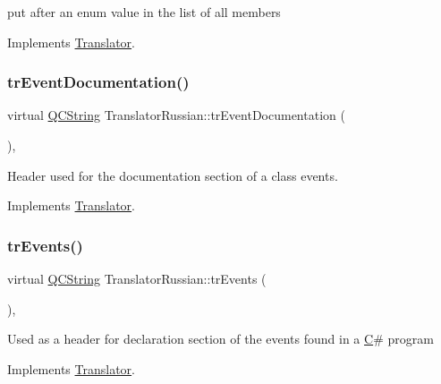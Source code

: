 put after an enum value in the list of all members 

Implements \mbox{\hyperlink{class_translator}{Translator}}.

\mbox{\label{class_translator_russian_a97ef3ac0ca3f70ea589feaa6b0208c50}} 
\subsubsection{\texorpdfstring{trEventDocumentation()}{trEventDocumentation()}}
{\footnotesize\ttfamily virtual \mbox{\hyperlink{class_q_c_string}{Q\+C\+String}} Translator\+Russian\+::tr\+Event\+Documentation (\begin{DoxyParamCaption}{ }\end{DoxyParamCaption})\hspace{0.3cm}{\ttfamily [inline]}, {\ttfamily [virtual]}}

Header used for the documentation section of a class\textquotesingle{} events. 

Implements \mbox{\hyperlink{class_translator}{Translator}}.

\mbox{\label{class_translator_russian_a6f01b3a46dbb6fc8d718c1d1060ff01b}} 
\subsubsection{\texorpdfstring{trEvents()}{trEvents()}}
{\footnotesize\ttfamily virtual \mbox{\hyperlink{class_q_c_string}{Q\+C\+String}} Translator\+Russian\+::tr\+Events (\begin{DoxyParamCaption}{ }\end{DoxyParamCaption})\hspace{0.3cm}{\ttfamily [inline]}, {\ttfamily [virtual]}}

Used as a header for declaration section of the events found in a \mbox{\hyperlink{class_c}{C}}\# program 

Implements \mbox{\hyperlink{class_translator}{Translator}}.

\mbox{\label{class_translator_russian_a6900b822ff8f49afe3b80cf789fca2ea}} 
